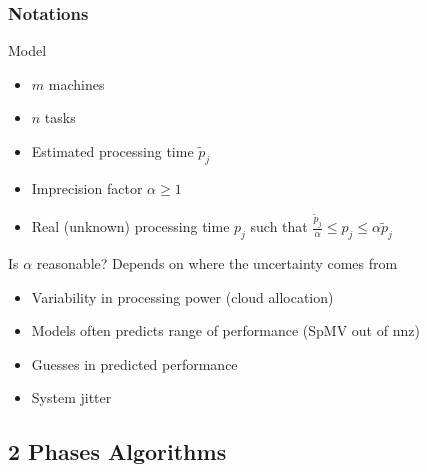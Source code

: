\documentclass[usenames,dvipsnames]{beamer}
\begin{document}
\begin{frame}
  \frametitle{Notations}

  \begin{block}{Model}
    \begin{itemize}
    \item $m$ machines
    \item $n$ tasks
    \item Estimated processing time $\tilde{p}_j$
    \item Imprecision factor $\alpha \geq 1$
    \item Real (unknown) processing time $p_j$ such that $\frac{\tilde{p}_{j}}{\alpha}\leq p_{j}\leq \alpha \tilde{p}_{j}$
    \end{itemize}
  \end{block}
  
  \pause

  \begin{block}{Is $\alpha$ reasonable?}
    Depends on where the uncertainty comes from
    \begin{itemize}
    \item Variability in processing power (cloud allocation)
    \item Models often predicts range of performance (SpMV out of nnz)
    \item Guesses in predicted performance
    \item System jitter
    \end{itemize}
  \end{block}
  
\end{frame}

\subsection{2 Phases Algorithms}
\end{document}
